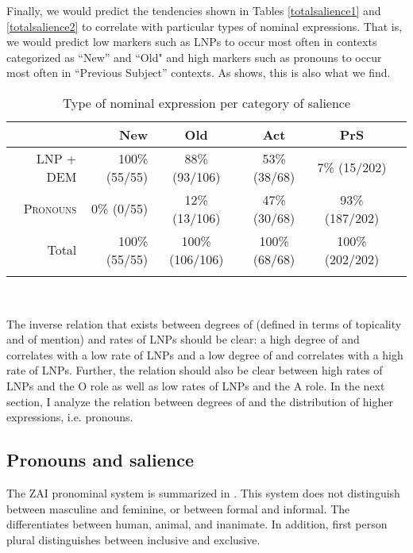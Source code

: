 Finally, we would predict the tendencies shown in Tables \ref{totalsalience1} and \ref{totalsalience2} to correlate with particular types of nominal expressions. That is, we would predict low  markers such as LNPs to occur most often in contexts categorized as ``New'' and ``Old" and high  markers such as pronouns to occur most often in ``Previous Subject'' contexts. As  shows, this is also what we find.
\begin{table}

\caption{{Type of nominal expression per category of salience}}
\begin{tabular}{ r  r  c  c  c  c }
\lsptoprule
 & New & Old & Act & PrS \\

\midrule
\textsc{LNP + DEM} &  100{\%} (55/55) &  88{\%} (93/106) & 53{\%} (38/68) & 7{\%} (15/202) \\

 
\textsc{Pronouns} & 0{\%} (0/55) & 12{\%} (13/106) & 47{\%} (30/68) & 93{\%} (187/202) \\

\midrule 
Total& 100{\%} (55/55) & 100{\%} (106/106) & 100{\%} (68/68) &100{\%} (202/202) \\

\lspbottomrule
\end{tabular}\\
\label{saliencetype}

\end{table}

The inverse relation that exists between degrees of  (defined in terms of topicality and  of mention) and rates of LNPs should be clear: a high degree of  and  correlates with a low rate of LNPs and a low degree of  and  correlates with a high rate of LNPs. Further, the relation should also be clear between high rates of LNPs and the O role as well as low rates of LNPs and the A role. In the next section, I analyze the relation between degrees of  and the distribution of higher  expressions, i.e. pronouns. 



\subsection{Pronouns and salience}\label{izpronouns}

The ZAI pronominal system is summarized in . This system does not distinguish between masculine and feminine, or between formal and informal. The  differentiates between human, animal, and inanimate. In addition, first person plural distinguishes between inclusive and exclusive.

